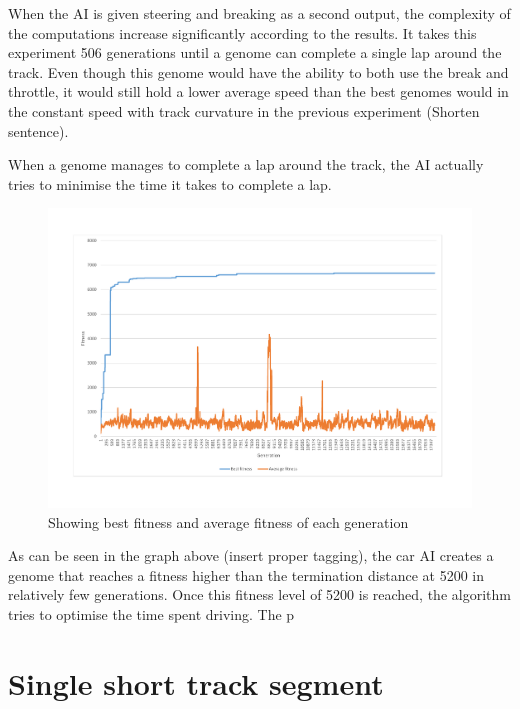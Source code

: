 When the AI is given steering and breaking as a second output, the complexity of the computations increase significantly according to the results. It takes this experiment 506 generations until a genome can complete a single lap around the track. Even though this genome would have the ability to both use the break and throttle, it would still hold a lower average speed than the best genomes would in the constant speed with track curvature in the previous experiment (Shorten sentence).

When a genome manages to complete a lap around the track, the AI actually tries to minimise the time it takes to complete a lap. 


\begin{figure}[h]
\includegraphics[width=16cm]{report/images/graphs/fitness}
\centering
\caption{Showing best fitness and average fitness of each generation}
\end{figure}

As can be seen in the graph above (insert proper tagging), the car AI creates a genome that reaches a fitness higher than the termination distance at 5200 in relatively few generations. Once this fitness level of 5200 is reached, the algorithm tries to optimise the time spent driving. The p

\section{Single short track segment}


